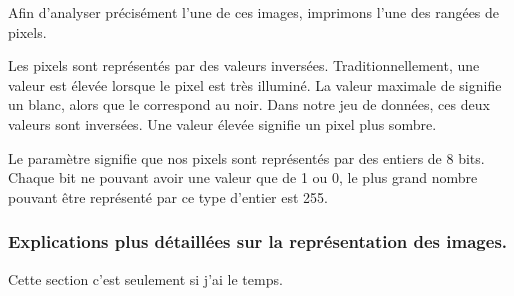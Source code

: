 \documentclass[letterpaper,10pt,french]{sphinxmanual}
\begin{document}
Afin d’analyser précisément l’une de ces images, imprimons l’une des rangées de pixels.

\begin{sphinxVerbatim}[commandchars=\\\{\}]
 \PYG{p}{[} \PYG{p}{]} \PYG{p}{[}\PYG{p}{]}\PYG{p}{[}\PYG{p}{]}
\PYG{p}{[} \PYG{p}{]} \PYG{p}{[}                 
                               
                       
                        
                                
                    \PYG{p}{]} 
\end{sphinxVerbatim}

Les pixels sont représentés par des valeurs  inversées. Traditionnellement, une valeur  est élevée lorsque le pixel est très illuminé. La valeur maximale de signifie un blanc, alors que le correspond au noir. Dans notre jeu de données, ces deux valeurs sont inversées. Une valeur élevée signifie un pixel plus sombre.

Le paramètre signifie que nos pixels sont représentés par des entiers de 8 bits. Chaque bit ne pouvant avoir une valeur que de 1 ou 0, le plus grand nombre pouvant être représenté par ce type d’entier est 255.


\subsubsection{Explications plus détaillées sur la représentation des images.}
\label{\detokenize{preprocessing:explications-plus-detaillees-sur-la-representation-des-images}}
Cette section c’est seulement si j’ai le temps.
\end{document}
